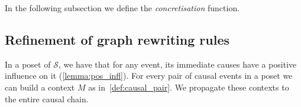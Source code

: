 
In the following subsection we define the \emph{concretisation} function.

\subsection{Refinement of graph rewriting rules}

In a poset of $\mathcal{S}$, we have that for any event, its immediate causes have a positive influence on it (\autoref{lemma:pos_infl}). For every pair of causal events in a poset we can build a context $M$ as in~\autoref{def:causal_pair}. We propagate these contexts to the entire causal chain.

